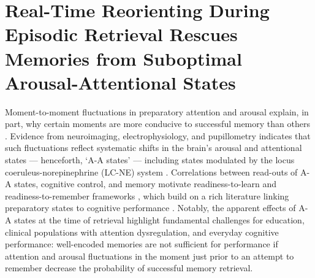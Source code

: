 \chapter[Real-Time Reorienting During Episodic Retrieval Rescues Memories]{Real-Time Reorienting During Episodic Retrieval Rescues Memories from Suboptimal Arousal-Attentional States}\label{ch:prism}

Moment-to-moment fluctuations in preparatory attention and arousal explain, in part, why certain moments are more conducive to successful memory than others \parencite{robison2022pupillary,miller2020variation,miller2019individual,cohen2015peri,madore2022readiness,madore2020memory,cohen2020prestimulus,evans2019preretrieval,curran2004effects,craik1996effects,baddeley1984attention,anderson1995status,soravia2016prestimulus,schwartz2025attending}. Evidence from neuroimaging, electrophysiology, and pupillometry indicates that such fluctuations reflect systematic shifts in the brain's arousal and attentional states — henceforth, `A-A states' — including states modulated by the locus coeruleus-norepinephrine (LC-NE) system \parencite{costa2016more,joshi2016relationships,sara2009locus,munn2021ascending,murphy2011pupillometry,murphy2014pupil,hong2014your,groot2021probing,huang2024locus}. Correlations between read-outs of A-A states, cognitive control, and memory motivate readiness-to-learn and readiness-to-remember frameworks \parencite{madore2022readiness,madore2020memory,schwartz2025attending,morcom2002getting}, which build on a rich literature linking preparatory states to cognitive performance \parencite{awh2012top,corbetta2002control,corbetta2008reorienting,debettencourt2018forgetting,fortenbaugh2015sustained,uncapher2009selecting,waskom2014frontoparietal,yoo2012when,aly2017how,strunk2019prestimulus,badre2018frontal,esterman2013zone,compton2019wandering,turnbull2019ebb,joshi2020pupil}. Notably, the apparent effects of A-A states at the time of retrieval highlight fundamental challenges for education, clinical populations with attention dysregulation, and everyday cognitive performance: well-encoded memories are not sufficient for performance if attention and arousal fluctuations in the moment just prior to an attempt to remember decrease the probability of successful memory retrieval.

